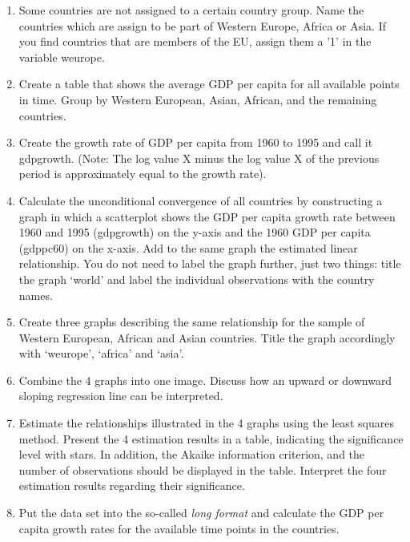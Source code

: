 \begin{enumerate}[1)]
	\item Some countries are not assigned to a certain country group. Name the countries which are assign to be part of Western Europe, Africa or Asia.
	If you find countries that are members of the EU, assign them a '1' in the variable weurope.
	\item Create a table that shows the average GDP per capita for all available points in time. Group by Western European, Asian, African, and the remaining countries.
	\item Create the growth rate of GDP per capita from 1960 to 1995 and call it gdpgrowth. (Note: The log value X minus the log value X of the previous period is approximately equal to the growth rate).
	\item Calculate the unconditional convergence of all countries by constructing a graph in which a scatterplot shows the GDP per capita growth rate between 1960 and 1995 (gdpgrowth) on the y-axis and the 1960 GDP per capita (gdppc60) on the x-axis. Add to the same graph the estimated linear relationship. You do not need to label the graph further, just two things: title the graph `world' and label the individual observations with the country names.
	\item Create three graphs describing the same relationship for the sample of Western European, African and Asian countries. Title the graph accordingly with `weurope', `africa' and `asia'. 
	\item Combine the 4 graphs into one image. Discuss how an upward or downward sloping regression line can be interpreted.

	\item Estimate the relationships illustrated in the 4 graphs using the least squares method. Present the 4 estimation results in a table, indicating the significance level with stars. In addition, the Akaike information criterion, and the number of observations should be displayed in the table. Interpret the four estimation results regarding their significance. 
	\item Put the data set into the so-called \textit{long format} and calculate the GDP per capita growth rates for the available time points in the countries.
\end{enumerate}

